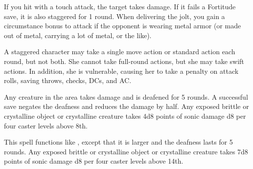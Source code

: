 \begin{spelleffect}
  If you hit with a touch attack, the target takes damage. If it fails a Fortitude save, it is also staggered for 1 round. When delivering the jolt, you gain a  circumstance bonus to attack if the opponent is wearing metal armor (or made out of metal, carrying a lot of metal, or the like).
\end{spelleffect}
\begin{spellnotes}
   A staggered character may take a single move action or standard action each round, but not both. She cannot take full-round actions, but she may take swift actions. In addition, she is vulnerable, causing her to take a  penalty on attack rolls, saving throws, checks, DCs, and AC.
\end{spellnotes}

\begin{spelleffect}
  Any creature in the area takes damage and is deafened for 5 rounds. A successful save negates the deafness and reduces the damage by half. Any exposed brittle or crystalline object or crystalline creature takes 4d8 points of sonic damage \add d8 per four caster levels above 8th.
\end{spelleffect}

\begin{spelleffect}
  This spell functions like , except that it is larger and the deafness lasts for 5 rounds. Any exposed brittle or crystalline object or crystalline creature takes 7d8 points of sonic damage \add d8 per four caster levels above 14th.
\end{spelleffect}

